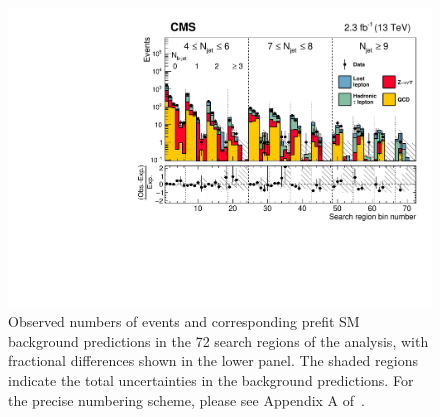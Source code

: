 \begin{figure}[ht]
\centering
\includegraphics[width=\linewidth]{figures/SusySearches/Ra2b2015/results-plot-prefit.pdf}
\caption{
  Observed numbers of events and corresponding prefit
  SM background predictions
  in the 72 search regions of the analysis,
  with fractional differences shown in the lower panel.
  The shaded regions indicate the total uncertainties in the background
  predictions. For the precise numbering scheme, please see Appendix A of~\cite{Khachatryan:2016kdk}.
}
\label{fig:fit-results}
\end{figure}


